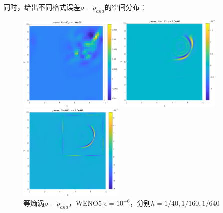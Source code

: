 \documentclass[UTF8,zihao=5]{ctexart} %
\begin{document}
同时，给出不同格式误差$\rho-\rho_{ana}$的空间分布：
\begin{figure}[H]
    \begin{minipage}[c]{0.32\linewidth}  %
        \centering
        \includegraphics[width=5cm]{Err_40_E6.png}  %
    \end{minipage}
    \hfill %
    \begin{minipage}[c]{0.32\linewidth}  %
        \centering
        \includegraphics[width=5cm]{Err_160_E6.png}  %
    \end{minipage}
    \hfill %
    \begin{minipage}[c]{0.32\linewidth}  %
        \centering
        \includegraphics[width=5cm]{Err_640_E6.png}  %
    \end{minipage}
    \caption{等熵涡$\rho-\rho_{ana}$，WENO5 $\epsilon=10^{-6}$，分别$h=1/40,1/160,1/640$}
\end{figure}
\end{document}
